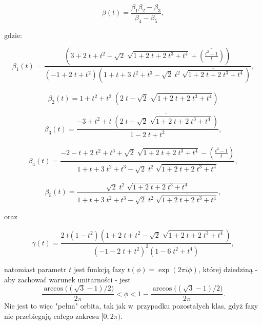 \documentclass[a4paper,12pt,twoside]{article}
\begin{document}
\begin{equation}
\beta(t) = \frac{\beta_1\beta_2-\beta_3}{\beta_4-\beta_5},
\end{equation}

gdzie:

\begin{equation}
\beta_1(t) = \frac{\left(3+2\;t+t^2-\sqrt{2}\;\sqrt{1+2\;t+2\;t^3+t^4}+\overline{\left(\frac{t^2-1}{t}\right)}\right)}{(-1+2\;t+t^2)\left(1+t+3\;t^2+t^3-\sqrt{2}\;t^2\;\overline{\sqrt{1+2\;t+2\;t^3+t^4}}\right)},
\end{equation}

\begin{equation}
\beta_2(t) = 1+t^2+t^2\;\overline{\left(2\;t-\sqrt{2}\;\sqrt{1+2\;t+2\;t^3+t^4}\right)}
\end{equation}

\begin{equation}
\beta_3(t) = \frac{-3+t^2+t\;\overline{\left(2\;t-\sqrt{2}\;\sqrt{1+2\;t+2\;t^3+t^4}\right)}}{1-2\;t+t^2},
\end{equation}

\begin{equation}
\beta_4(t) = \frac{-2-t+2\;t^2+t^3+\sqrt{2}\;\sqrt{1+2\;t+2\;t^3+t^4}-\overline{\left(\frac{t^2-1}{t}\right)}}{1+t+3\;t^2+t^3-\sqrt{2}\;t^2\;\overline{\sqrt{1+2\;t+2\;t^3+t^4}}},
\end{equation}

\begin{equation}
\beta_5(t) = \frac{\sqrt{2}\;t^2\;\overline{\sqrt{1+2\;t+2\;t^3+t^4}}}{1+t+3\;t^2+t^3-\sqrt{2}\;t^2\;\overline{\sqrt{1+2\;t+2\;t^3+t^4}}},
\end{equation}

oraz

\begin{equation}
\gamma(t) = \frac{2\;t(1-t^2)\left(1+2\;t+t^2-\sqrt{2}\;\sqrt{1+2\;t+2\;t^3+t^4}\right)}{\left(-1-2\;t+t^2 \right)^2\left(1-6\;t^2+t^4\right)},
\end{equation}

natomiast parametr $t$ jest funkcj\k{a} fazy $t(\phi) = \exp(2 \pi i \phi)$, kt\'{o}rej dziedzin\k{a} - aby zachowa\'{c} warunek unitarno\'{s}ci - jest
\begin{equation}
\frac{ \arccos\big((\sqrt{3}-1)/2\big) } {2 \pi} < \phi < 1 - \frac{ \arccos\big((\sqrt{3}-1)/2\big) } {2 \pi}.
\end{equation}
Nie jest to wi\k{e}c "pe{\l}na" orbita, tak jak w~przypadku pozosta{\l}ych klas, gdy\.{z} fazy nie przebiegaj\k{a} ca{\l}ego zakresu $[0, 2\pi)$.
\end{document}
